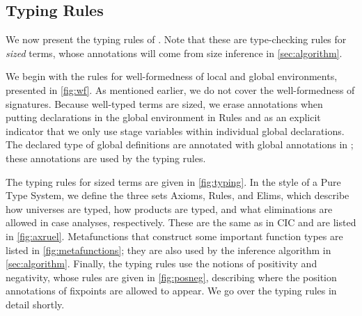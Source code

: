 \documentclass[nonacm,screen,10pt]{acmart}
\begin{document}


\subsection{Typing Rules}









We now present the typing rules of \lang. Note that these are type-checking rules for \textit{sized} terms, whose annotations will come from size inference in \autoref{sec:algorithm}.

We begin with the rules for well-formedness of local and global environments, presented in \autoref{fig:wf}. As mentioned earlier, we do not cover the well-formedness of signatures. Because well-typed terms are sized, we erase annotations when putting declarations in the global environment in Rules  and  as an explicit indicator that we only use stage variables within individual global declarations. The declared type of global definitions are annotated with global annotations in ; these annotations are used by the typing rules.

The typing rules for sized terms are given in \autoref{fig:typing}. In the style of a Pure Type System, we define the three sets Axioms, Rules, and Elims, which describe how universes are typed, how products are typed, and what eliminations are allowed in case analyses, respectively. These are the same as in CIC and are listed in \autoref{fig:axruel}. Metafunctions that construct some important function types are listed in \autoref{fig:metafunctions}; they are also used by the inference algorithm in \autoref{sec:algorithm}. Finally, the typing rules use the notions of positivity and negativity, whose rules are given in \autoref{fig:posneg}, describing where the position annotations of fixpoints are allowed to appear. We go over the typing rules in detail shortly.
\end{document}
